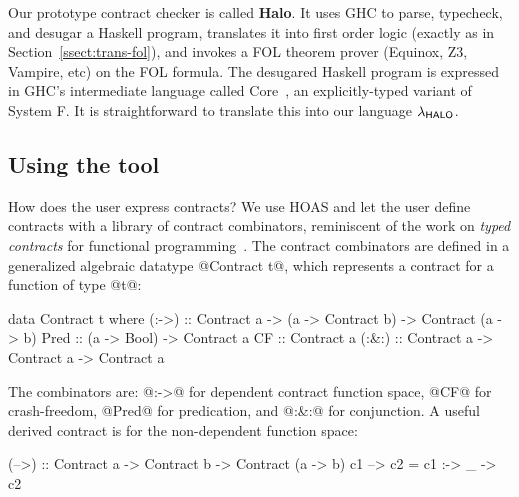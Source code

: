 Our prototype contract checker is called \textbf{Halo}.
It uses GHC to parse, typecheck, and desugar a Haskell program,
translates it into first order logic (exactly as in Section~\ref{ssect:trans-fol}), and
invokes a FOL theorem prover (Equinox, Z3, Vampire, etc) on the FOL formula.
The desugared Haskell program is expressed in GHC's intermediate language
called Core~\cite{fc-paper}, an explicitly-typed variant of System F.  It is straightforward
to translate this into our language $\lambda_{\sf HALO}$.

\subsection{Using the tool}

How does the user express contracts? We use HOAS and let the user
define contracts with a library of contract combinators, reminiscent 
of the work on {\em typed contracts} for functional 
programming~\cite{Hinze:2006:TCF:2100071.2100093}.
The contract combinators are defined in a generalized algebraic 
datatype @Contract t@, which represents a contract for a function of type @t@:
\begin{code}
data Contract t where
  (:->) :: Contract a 
        -> (a -> Contract b)
        -> Contract (a -> b)
  Pred  :: (a -> Bool) -> Contract a
  CF    :: Contract a
  (:&:) :: Contract a -> Contract a -> Contract a
\end{code}
The combinators are: @:->@ for dependent contract function space, @CF@
for crash-freedom, @Pred@ for predication, and
@:&:@ for conjunction. A useful derived contract is for the 
non-dependent function space:
\par {\small
\begin{code}
(-->) :: Contract a -> Contract b -> Contract (a -> b)
c1 --> c2 = c1 :-> \_ -> c2
\end{code}
} \par
%
%

